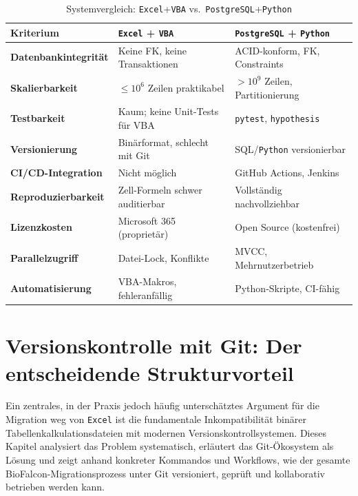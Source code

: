 ﻿\documentclass[12pt,a4paper]{report}
\theoremstyle{definition}
\theoremstyle{remark}
\newcommand{\excel}{\texttt{Excel}}
\newcommand{\vba}{\texttt{VBA}}
\newcommand{\pg}{\texttt{PostgreSQL}}
\newcommand{\py}{\texttt{Python}}
\newcommand{\code}[1]{\texttt{#1}}
\begin{document}
\begin{table}[H]
\centering
\caption{Systemvergleich: \excel{}+\vba{} vs.\ \pg{}+\py}
\label{tab:vergleich}
\renewcommand{\arraystretch}{1.35}
\begin{tabularx}{\linewidth}{>{\bfseries\footnotesize}l
                              >{\footnotesize}X
                              >{\footnotesize}X}
\toprule
Kriterium          & \excel{} + \vba{}                       & \pg{} + \py{} \\
\midrule
Datenbankintegrität & Keine FK, keine Transaktionen          & ACID-konform, FK, Constraints \\
Skalierbarkeit      & $\leq 10^6$ Zeilen praktikabel         & $> 10^9$ Zeilen, Partitionierung \\
Testbarkeit         & Kaum; keine Unit-Tests für VBA         & \code{pytest}, \code{hypothesis} \\
Versionierung       & Binärformat, schlecht mit Git           & SQL/\py{} versionierbar \\
CI/CD-Integration   & Nicht m\"oglich                           & GitHub Actions, Jenkins \\
Reproduzierbarkeit  & Zell-Formeln schwer auditierbar         & Vollständig nachvollziehbar \\
Lizenzkosten        & Microsoft 365 (proprietär)             & Open Source (kostenfrei) \\
Parallelzugriff     & Datei-Lock, Konflikte                  & MVCC, Mehrnutzerbetrieb \\
Automatisierung     & VBA-Makros, fehleranfällig             & Python-Skripte, CI-fähig \\
\bottomrule
\end{tabularx}
\end{table}

\newpage
\chapter{Versionskontrolle mit Git: Der entscheidende Strukturvorteil}
\label{sec:git}

Ein zentrales, in der Praxis jedoch häufig unterschätztes Argument für die
Migration weg von \excel{} ist die fundamentale Inkompatibilität binärer
Tabellenkalkulationsdateien mit modernen Versionskontrollsystemen.
Dieses Kapitel analysiert das Problem systematisch, erläutert das
Git-Ökosystem als Lösung und zeigt anhand konkreter Kommandos und
Workflows, wie der gesamte BioFalcon-Migrationsprozess unter Git
versioniert, geprüft und kollaborativ betrieben werden kann.
\end{document}
